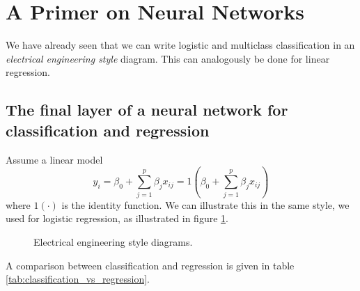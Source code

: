 \section{A Primer on Neural Networks\skipthis}
\thispagestyle{plain}

We have already seen that we can write logistic and multiclass
classification in an \textit{electrical engineering style} diagram.
This can analogously be done for linear regression.

\subsection{The final layer of a neural network for classification and regression}
Assume a linear model
\begin{equation}
    \hat{y}_i = \beta_0 + \sum_{j=1}^{p} \beta_j x_{ij} = 1( \beta_0 + \sum_{j=1}^{p} \beta_j x_{ij} )
\end{equation}
where $1(\cdot)$ is the identity function. We can illustrate this in the same
style, we used for logistic regression, as illustrated in figure
\ref{fig:lin_class_electrical}.

\begin{figure}[!htb]
    \centering
    
    \caption{Electrical engineering style diagrams.}
    \label{fig:lin_class_electrical}
\end{figure}

A comparison between classification and regression is given in table \ref{tab:classification_vs_regression}.


